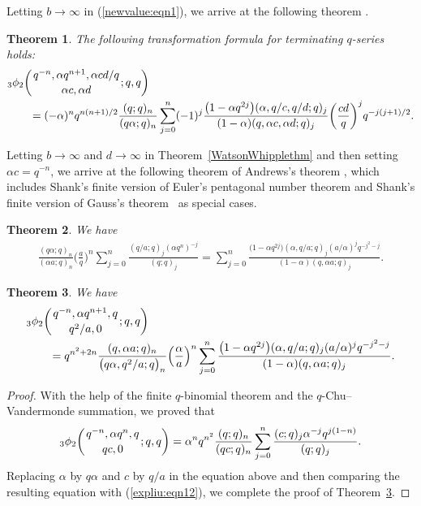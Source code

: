 \documentclass[10pt,a4paper]{amsart}
\numberwithin{equation}{section}
\newtheorem{Theorem}{Theorem}[section]
\begin{document}
 Letting $b\to \infty$ in (\ref{newvalue:eqn1}), we arrive at the following theorem \cite[Proposition~2.3]{Liu2013IJTN}.
 \begin{Theorem}\label{spwwthm} The following transformation formula for terminating $q$-series holds:
 	\begin{align}
 	&{_3\phi_2}\biggl({{q^{-n}, \alpha q^{n+1}, \alpha cd/q }\atop{\alpha c, \alpha d}}; q, q\biggr)\nonumber\\
 	&\qquad{}=(-\alpha)^n q^{n(n+1)/2}\frac{(q; q)_n}{(q\alpha; q)_n}
 	\sum_{j=0}^n (-1)^j\frac{\bigl(1-\alpha q^{2j}\bigr) (\alpha, q/c, q/d; q)_j}
 	{(1-\alpha)(q, \alpha c, \alpha d; q)_j}\biggl(\frac{ cd}{q}\biggr)^{j} q^{-j(j+1)/2}.\label{expliu:eqn11}
 \end{align}
 \end{Theorem}	
Letting $b \to \infty$ and $d\to \infty$ in Theorem~\ref{WatsonWhipplethm} and then setting $\alpha c=q^{-n}$,
we arrive at the following theorem of Andrews's theorem \cite[equation~(4.6)]{Andrews86}, which includes Shank's finite version of Euler's pentagonal number theorem \cite{Shanks1951} and Shank's finite version of Gauss's theorem~\cite{Shanks1958} as special cases.
\begin{Theorem} %
We have
\begin{align}\label{expliu:eqn12}
\frac{(q\alpha; q)_n}{(\alpha a; q)_n}\biggl(\frac{a}{q}\biggr)^n
	\sum_{j=0}^n \frac{(q/a; q)_j (\alpha q^n)^{-j}}{(q; q)_j}
=\sum_{j=0}^n \frac{\bigl(1-\alpha q^{2j}\bigr) (\alpha, q/a; q)_j (a/{\alpha})^j q^{-j^2-j}}{(1-\alpha)(q, \alpha a; q)_j}.
\end{align}	
\end{Theorem}

\begin{Theorem}\label{andrewsliu} We have
\begin{align*}%
&{_3\phi_2}\biggl({{q^{-n}, \alpha q^{n+1},q}\atop{q^2/a, 0}}; q, q\biggr)\\
&\qquad{}=q^{n^2+2n} \frac{(q, \alpha a; q)_n}{\bigl(q\alpha, q^2/a; q\bigr)_n} \Bigl(\frac{\alpha}{a}\Bigr)^n \sum_{j=0}^n \frac{\bigl(1-\alpha q^{2j}\bigr) (\alpha, q/a; q)_j (a/{\alpha})^j q^{-j^2-j}}{(1-\alpha)(q, \alpha a; q)_j}.\nonumber
\end{align*}	
\end{Theorem}
\begin{proof}
 With the help of the finite $q$-binomial theorem and the $q$-Chu--Vandermonde summation, we \cite[Lemma~4.1]{Liu2013RamanJ} proved that
	\begin{align*}%
	{_3\phi_2}\biggl({{q^{-n}, \alpha q^n,q}\atop{qc, 0}}; q, q\biggr)
	=\alpha^n q^{n^2}\frac{(q; q)_n}{(qc; q)_n}
		\sum_{j=0}^n \frac{(c; q)_j \alpha^{-j} q^{j(1-n)}}{(q; q)_j}.
	\end{align*}
Replacing $\alpha$ by $q\alpha$ and $c$ by $q/a$ in the equation above and then comparing the resulting equation with (\ref{expliu:eqn12}), we complete the proof of Theorem~\ref{andrewsliu}.
\end{proof}
\end{document}
